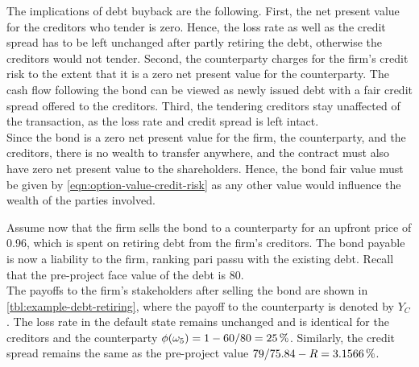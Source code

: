 \documentclass[main.tex]{subfiles}
\begin{document}
            The implications of debt buyback are the following.
            First, the net present value for the creditors who tender is zero. 
            Hence, the loss rate as well as the credit spread has to be left unchanged
            after partly retiring the debt, otherwise the creditors would not tender. 
            Second, the counterparty charges for the firm's credit risk 
            to the extent that it is a zero net present value for the counterparty. 
            The cash flow following the bond can be viewed as newly issued debt
            with a fair credit spread offered to the creditors.
            Third, the tendering creditors stay unaffected of the transaction, 
            as the loss rate and credit spread is left intact.
            \\
            Since the bond is a zero net present value for the firm, 
            the counterparty, and the creditors, there is no wealth to transfer anywhere,
            and the contract must also have zero net present value to the shareholders. 
            Hence, the bond fair value must be given by \cref{eqn:option-value-credit-risk} 
            as any other value would influence the wealth of the parties involved.

            Assume now that the firm sells the bond to a counterparty
            for an upfront price of \num{0.96},
            which is spent on retiring debt from the firm's creditors. 
            The bond payable is now a liability to the firm, 
            ranking pari passu with the existing debt.
            Recall that the pre-project face value of the debt is \num{80}.
            \\ 
            The payoffs to the firm's stakeholders after selling the bond 
            are shown in \cref{tbl:example-debt-retiring},
            where the payoff to the counterparty is denoted by $Y_{C}$. 
            The loss rate in the default state remains unchanged 
            and is identical for the creditors and the counterparty
            $\phi(\omega_{5})=1-\num{60}/\num{80}=\pct{0.25}$. 
            Similarly, the credit spread remains the same as the pre-project value
            $\num{79}/\num{75.84}-R=\pct{0.031566}$.
            
\end{document}
